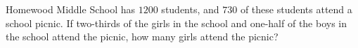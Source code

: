 Homewood Middle School has $1200$ students, and $730$ of these students attend a school picnic. If two-thirds of the girls in the school and one-half of the boys in the school attend the picnic, how many girls attend the picnic?
